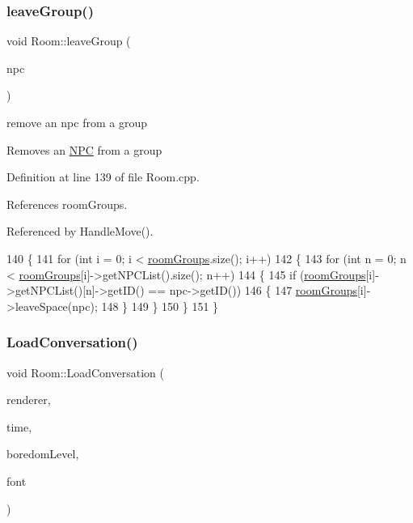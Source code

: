 \subsubsection{\texorpdfstring{leave\+Group()}{leaveGroup()}}
{\footnotesize\ttfamily void Room\+::leave\+Group (\begin{DoxyParamCaption}\item[{std\+::shared\+\_\+ptr$<$ \hyperlink{class_n_p_c}{N\+PC} $>$}]{npc }\end{DoxyParamCaption})}



remove an npc from a group 

Removes an \hyperlink{class_n_p_c}{N\+PC} from a group 

Definition at line 139 of file Room.\+cpp.



References room\+Groups.



Referenced by Handle\+Move().


\begin{DoxyCode}
140 \{
141     \textcolor{keywordflow}{for} (\textcolor{keywordtype}{int} i = 0; i < \hyperlink{class_room_a2d63fa17f30d50dd5267f04170a662b0}{roomGroups}.size(); i++)
142     \{
143         \textcolor{keywordflow}{for} (\textcolor{keywordtype}{int} n = 0; n < \hyperlink{class_room_a2d63fa17f30d50dd5267f04170a662b0}{roomGroups}[i]->getNPCList().size(); n++)
144         \{
145             \textcolor{keywordflow}{if} (\hyperlink{class_room_a2d63fa17f30d50dd5267f04170a662b0}{roomGroups}[i]->getNPCList()[n]->getID() == npc->getID())
146             \{
147                 \hyperlink{class_room_a2d63fa17f30d50dd5267f04170a662b0}{roomGroups}[i]->leaveSpace(npc);
148             \}
149         \}
150     \}
151 \}
\end{DoxyCode}
\mbox{\label{class_room_a85476905ce9262f07dbb4a25f9729545}} 
\subsubsection{\texorpdfstring{Load\+Conversation()}{LoadConversation()}}
{\footnotesize\ttfamily void Room\+::\+Load\+Conversation (\begin{DoxyParamCaption}\item[{S\+D\+L\+\_\+\+Renderer $\ast$}]{renderer,  }\item[{bool}]{time,  }\item[{std\+::string}]{boredom\+Level,  }\item[{T\+T\+F\+\_\+\+Font $\ast$}]{font }\end{DoxyParamCaption})}



